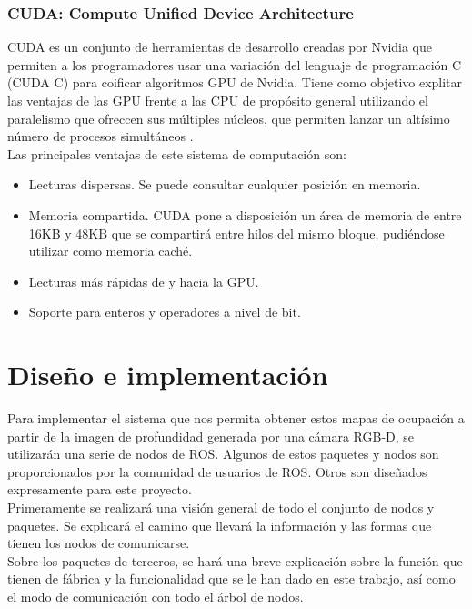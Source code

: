 \subsection{CUDA: Compute Unified Device Architecture}

CUDA es un conjunto de herramientas de desarrollo creadas por Nvidia que permiten a los programadores usar una variación del lenguaje de programación C (CUDA C) para coificar algoritmos GPU de Nvidia. Tiene como objetivo explitar las ventajas de las GPU frente a las CPU de propósito general utilizando el paralelismo que ofreccen sus múltiples núcleos, que permiten lanzar un altísimo número de procesos simultáneos \cite{cuda}.\\

Las principales ventajas de este sistema de computación son:

\begin{itemize}

	\item Lecturas dispersas. Se puede consultar cualquier posición en memoria.
	\item Memoria compartida. CUDA pone a disposición un área de memoria de entre 16KB y 48KB que se compartirá entre hilos del mismo bloque, pudiéndose utilizar como memoria caché.
	\item Lecturas más rápidas de y hacia la GPU.
	\item Soporte para enteros y operadores a nivel de bit.

\end{itemize}



\chapter{Diseño e implementación}

Para implementar el sistema que nos permita obtener estos mapas de ocupación a partir de la imagen de profundidad generada por una cámara RGB-D, se utilizarán una serie de nodos de ROS. Algunos de estos paquetes y nodos son proporcionados por la comunidad de usuarios de ROS. Otros son diseñados expresamente para este proyecto.\\

Primeramente se realizará una visión general de todo el conjunto de nodos y paquetes. Se explicará el camino que llevará la información y las formas que tienen los nodos de comunicarse.\\

Sobre los paquetes de terceros, se hará una breve explicación sobre la función que tienen de fábrica y la funcionalidad que se le han dado en este trabajo, así como el modo de comunicación con todo el árbol de nodos.\\

